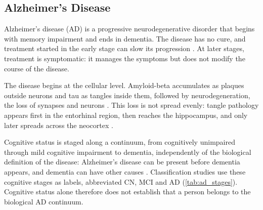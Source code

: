 \subsection{Alzheimer's Disease}
\label{subsec:alzheimer}

Alzheimer's disease (AD) is a progressive neurodegenerative disorder that begins with memory impairment and ends in dementia. The disease has no cure, and treatment started in the early stage can slow its progression \parencite{nibila2026artificial}. At later stages, treatment is symptomatic: it manages the symptoms but does not modify the course of the disease.

The disease begins at the cellular level. Amyloid-beta accumulates as plaques outside neurons and tau as tangles inside them, followed by neurodegeneration, the loss of synapses and neurons \parencite{jack2018niaaa}. This loss is not spread evenly: tangle pathology appears first in the entorhinal region, then reaches the hippocampus, and only later spreads across the neocortex \parencite{braak1991neuropathological}.

Cognitive status is staged along a continuum, from cognitively unimpaired through mild cognitive impairment to dementia, independently of the biological definition of the disease: Alzheimer's disease can be present before dementia appears, and dementia can have other causes \parencite{jack2018niaaa}. Classification studies use these cognitive stages as labels, abbreviated CN, MCI and AD (\cref{tab:ad_stages}). Cognitive status alone therefore does not establish that a person belongs to the biological AD continuum.


